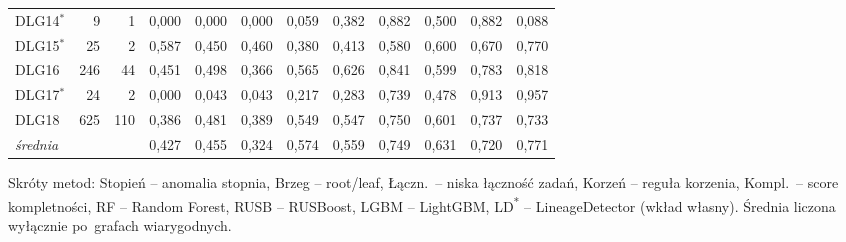 \begin{table}[ht]
\begin{tabular}{lrrccccccccc}
DLG14$^{*}$ & 9 & 1 & 0{,}000 & 0{,}000 & 0{,}000 & 0{,}059 & 0{,}382 & 0{,}882 & 0{,}500 & 0{,}882 & 0{,}088 \\
DLG15$^{*}$ & 25 & 2 & 0{,}587 & 0{,}450 & 0{,}460 & 0{,}380 & 0{,}413 & 0{,}580 & 0{,}600 & 0{,}670 & 0{,}770 \\
DLG16 & 246 & 44 & 0{,}451 & 0{,}498 & 0{,}366 & 0{,}565 & 0{,}626 & 0{,}841 & 0{,}599 & 0{,}783 & 0{,}818 \\
DLG17$^{*}$ & 24 & 2 & 0{,}000 & 0{,}043 & 0{,}043 & 0{,}217 & 0{,}283 & 0{,}739 & 0{,}478 & 0{,}913 & 0{,}957 \\
DLG18 & 625 & 110 & 0{,}386 & 0{,}481 & 0{,}389 & 0{,}549 & 0{,}547 & 0{,}750 & 0{,}601 & 0{,}737 & 0{,}733 \\
\midrule
\emph{średnia} & & & 0{,}427 & 0{,}455 & 0{,}324 & 0{,}574 & 0{,}559 & 0{,}749 & 0{,}631 & 0{,}720 & 0{,}771 \\
\bottomrule
\end{tabular}

\vspace{0.4em}
\footnotesize Skróty metod: Stopień – anomalia stopnia, Brzeg – root/leaf, Łączn.\ – niska łączność zadań, Korzeń – reguła korzenia, Kompl.\ – score kompletności, RF – Random Forest, RUSB – RUSBoost, LGBM – LightGBM, LD\textsuperscript{*} – LineageDetector (wkład własny). Średnia liczona wyłącznie po~grafach wiarygodnych.
\end{table}

\clearpage

